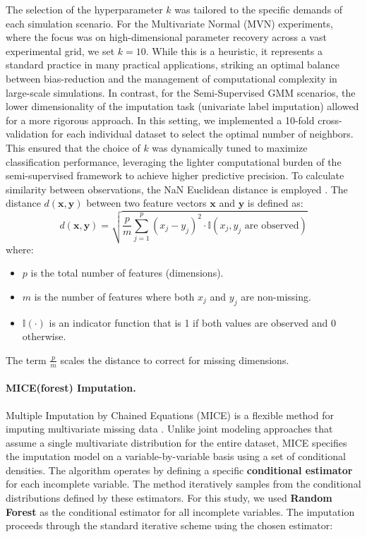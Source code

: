 \documentclass[11pt, a4paper]{article}
\begin{document}
The selection of the hyperparameter $k$ was tailored to the specific demands of each simulation 
scenario. For the Multivariate Normal (MVN) experiments, 
where the focus was on high-dimensional parameter recovery across a vast experimental grid, 
we set $k=10$. While this is a heuristic, it represents a standard practice in many practical 
applications, striking an optimal balance between bias-reduction and the management of 
computational complexity in large-scale simulations. In contrast, for the Semi-Supervised 
GMM scenarios, the lower dimensionality of the imputation task (univariate label imputation) 
allowed for a more rigorous approach. In this setting, we implemented a 10-fold cross-validation
 for each individual dataset to select the optimal number of neighbors. This ensured that the 
 choice of $k$ was dynamically tuned to maximize classification performance, leveraging the 
 lighter computational burden of the semi-supervised framework to achieve higher predictive 
 precision.
To calculate similarity between observations, the NaN Euclidean distance is employed \citep{Khan2026}.
The distance $d(\mathbf{x}, \mathbf{y})$ between two feature vectors $\mathbf{x}$ and $\mathbf{y}$ is defined as:
\begin{equation}
    d(\mathbf{x}, \mathbf{y}) = \sqrt{ \frac{p}{m} \sum_{j=1}^{p} (x_j - y_j)^2 \cdot \mathbb{I}(x_j, y_j \text{ are observed}) }
\end{equation}
where:
\begin{itemize}
    \item $p$ is the total number of features (dimensions).
    \item $m$ is the number of features where both $x_j$ and $y_j$ are non-missing.
    \item $\mathbb{I}(\cdot)$ is an indicator function that is 1 if both values are observed and 0 otherwise.
\end{itemize}
The term $\frac{p}{m}$ scales the distance to correct for missing dimensions.

\paragraph{MICE(forest) Imputation.}
Multiple Imputation by Chained Equations (MICE) is a flexible method for imputing multivariate missing data \citep{VanBuuren2011}.
Unlike joint modeling approaches that assume a single multivariate distribution for the entire dataset, MICE specifies the imputation model on a variable-by-variable basis using a set of conditional densities.
The algorithm operates by defining a specific \textbf{conditional estimator} for each incomplete variable.
The method iteratively samples from the conditional distributions defined by these estimators.
For this study, we used \textbf{Random Forest} as the conditional estimator for all incomplete variables.
The imputation proceeds through the standard iterative scheme using the chosen estimator:
\end{document}
